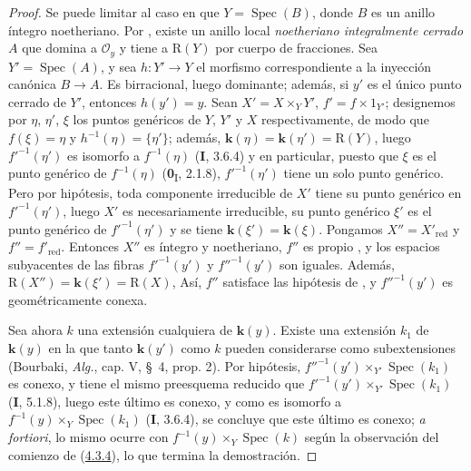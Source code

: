 \begin{proof}
Se puede limitar al caso en que $Y=\operatorname{Spec}(B)$, donde $B$ es un anillo
íntegro noetheriano. Por , existe un anillo local
\emph{noetheriano integralmente cerrado} $A$ que domina a $\mathcal O_y$ y tiene a
$\mathrm R(Y)$ por cuerpo de fracciones. Sea $Y'=\operatorname{Spec}(A)$, y
sea $h:Y'\to Y$ el morfismo correspondiente a la inyección canónica
$B\to A$. Es birracional, luego dominante; además, si $y'$ es el
único punto cerrado de $Y'$, entonces $h(y')=y$. Sean
$X'=X\times_YY'$, $f'=f\times1_{Y'}$; designemos por $\eta$, $\eta'$,
$\xi$ los puntos genéricos de $Y$, $Y'$ y $X$ respectivamente, de modo
que $f(\xi)=\eta$ y $h^{-1}(\eta)=\{\eta'\}$; además,
$\boldsymbol{k}(\eta)=\boldsymbol{k}(\eta')=\mathrm R(Y)$, luego $f'^{-1}(\eta')$ es isomorfo a
$f^{-1}(\eta)$ (\textbf{I}, 3.6.4) y en particular, puesto que $\xi$ es el punto
genérico de $f^{-1}(\eta)$ (\textbf{0}\textsubscript{I}, 2.1.8),
$f'^{-1}(\eta')$ tiene un solo punto genérico. Pero por hipótesis, toda
componente irreducible de $X'$ tiene su punto genérico en
$f'^{-1}(\eta')$, luego $X'$ es necesariamente irreducible, su punto
genérico $\xi'$ es el punto genérico de $f'^{-1}(\eta')$ y se tiene
$\boldsymbol{k}(\xi')=\boldsymbol{k}(\xi)$.
Pongamos $X''=X'_{\mathrm{red}}$ y $f''=f'_{\mathrm{red}}$. Entonces
$X''$ es íntegro y noetheriano, $f''$ es propio
, y los espacios subyacentes de las fibras
$f'^{-1}(y')$ y $f''^{-1}(y')$ son iguales. Además,
$\mathrm R(X'')=\boldsymbol{k}(\xi')=\mathrm R(X)$,
Así, $f''$ satisface las hipótesis de , y
$f''^{-1}(y')$ es geométricamente conexa.

Sea ahora $k$ una extensión cualquiera de $\boldsymbol{k}(y)$. Existe una
extensión $k_1$ de $\boldsymbol{k}(y)$ en la que tanto $\boldsymbol{k}(y')$ como $k$ pueden considerarse como subextensiones (Bourbaki, \emph{Alg.}, cap. V, \S~4, prop. 2). Por hipótesis, $f''^{-1}(y')\times_{Y'}\operatorname{Spec}(k_1)$ es conexo, y tiene el mismo preesquema reducido que $f'^{-1}(y')\times_{Y'}\operatorname{Spec}(k_1)$ (\textbf{I}, 5.1.8), luego este último es conexo, y como es isomorfo a $f^{-1}(y)\times_Y\operatorname{Spec}(k_1)$ (\textbf{I}, 3.6.4), se concluye que este último es conexo; \emph{a fortiori}, lo mismo ocurre con $f^{-1}(y)\times_Y\operatorname{Spec}(k)$ según la observación del comienzo de (\hyperref[III.4.3.4-fr]{4.3.4}), lo que termina la demostración.
\end{proof}

